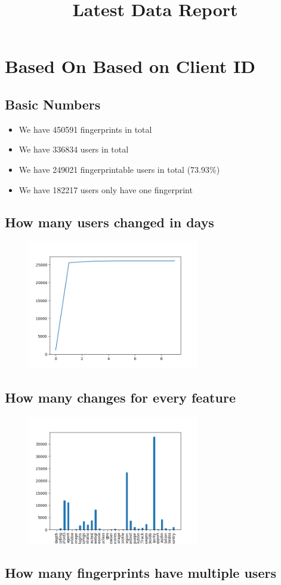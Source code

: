 \documentclass[10pt, conference, compsocconf]{IEEEtran}
\begin{document}
\title{Latest Data Report}
\author{
}
\maketitle
\section{Based On Based on Client ID}
\subsection{Basic Numbers}
\begin{itemize}\item We have 450591 fingerprints in total\item We have 336834 users in total\item We have 249021 fingerprintable users in total (73.93\%)\item We have 182217 users only have one fingerprint \end{itemize}\subsection{How many users changed in days}
\begin{figure}[H]\centering\includegraphics[width=75mm,scale=0.5]{BasedonClientIDchangebytime}\end{figure}\subsection{How many changes for every feature}
\begin{figure}[H]\centering\includegraphics[width=75mm,scale=0.5]{BasedonClientIDfeaturechange}\end{figure}\subsection{How many fingerprints have multiple users}
\end{document}
